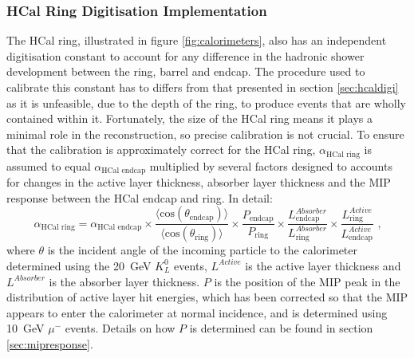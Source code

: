 \subsubsection{HCal Ring Digitisation Implementation}
\label{sec:hcalringdigi}
The HCal ring, illustrated in figure \ref{fig:calorimeters}, also has an independent digitisation constant to account for any difference in the hadronic shower development between the ring, barrel and endcap.  The procedure used to calibrate this constant has to differs from that presented in section \ref{sec:hcaldigi} as it is unfeasible, due to the depth of the ring, to produce events that are wholly contained within it.  Fortunately, the size of the HCal ring means it plays a minimal role in the reconstruction, so precise calibration is not crucial.  To ensure that the calibration is approximately correct for the HCal ring, $\alpha_{\text{HCal ring}}$ is assumed to equal $\alpha_{\text{HCal endcap}}$ multiplied by several factors designed to accounts for changes in the active layer thickness, absorber layer thickness and the MIP response between the HCal endcap and ring.  In detail:
%
\begin{equation}
\alpha_{\text{HCal ring}} = \alpha_{\text{HCal endcap}} \times \frac{\langle \text{cos}(\theta_\text{endcap}) \rangle}{\langle \text{cos}(\theta_\text{ring}) \rangle} \times \frac{P_\text{endcap} }{P_\text{ring} } \times \frac{L^{Absorber}_\text{endcap}}{L^{Absorber}_\text{ring} } \times \frac{L^{Active}_\text{ring}}{L^{Active}_\text{endcap}} \text{ ,}
\end{equation}
%
\noindent where $\theta$ is the incident angle of the incoming particle to the calorimeter determined using the 20~GeV $K^{0}_{L}$ events, $L^{Active}$ is the active layer thickness and $L^{Absorber}$ is the absorber layer thickness. $P$ is the position of the MIP peak in the distribution of active layer hit energies, which has been corrected so that the MIP appears to enter the calorimeter at normal incidence, and is determined using 10~GeV $\mu^{-}$ events.  Details on how $P$ is determined can be found in section \ref{sec:mipresponse}.

